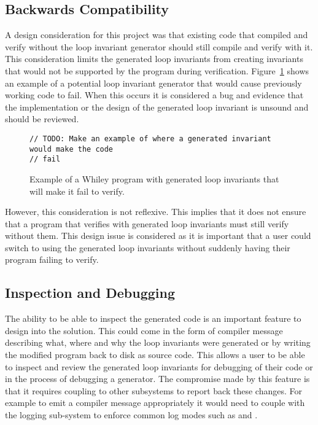 \subsection{Backwards Compatibility}

A design consideration for this project was that existing code that compiled
and verify without the loop invariant generator should still compile and verify
with it.
This consideration limits the generated loop invariants from creating
invariants that would not be supported by the program during verification.
Figure~\ref{lst:backwards-compat} shows an example of a potential loop
invariant generator that would cause previously working code to fail.
When this occurs it is considered a bug and evidence that the implementation or
the design of the generated loop invariant is unsound and should be reviewed.

\begin{figure}[ht]
\begin{lstlisting}
// TODO: Make an example of where a generated invariant would make the code
// fail
\end{lstlisting}
    \label{lst:backwards-compat}
    \caption{Example of a Whiley program with generated loop invariants that will
    make it fail to verify.}
\end{figure}

However, this consideration is not reflexive.
This implies that it does not ensure that a program that verifies with
generated loop invariants must still verify without them.
This design issue is considered as it is important that a user could
switch to using the generated loop invariants without suddenly having
their program failing to verify.


\subsection{Inspection and Debugging}

The ability to be able to inspect the generated code is an important feature to
design into the solution.
This could come in the form of compiler message describing what, where and why
the loop invariants were generated or by writing the modified program back
to disk as source code.
This allows a user to be able to inspect and review the generated loop invariants for
debugging of their code or in the process of debugging a generator.
The compromise made by this feature is that it requires coupling to other
subsystems to report back these changes.
For example to emit a compiler message appropriately it would need
to couple with the logging sub-system to enforce common log modes such as
 and .


